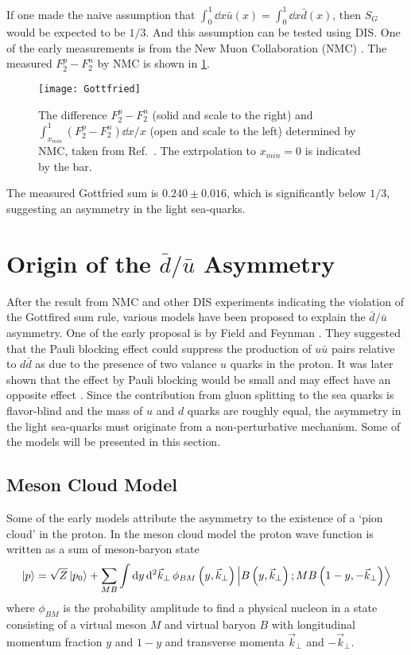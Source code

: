 \documentclass[../main.tex]{subfiles}
\begin{document}
If one made the naive assumption that $\int_0^1\dd{x} \bar{u}\left(x\right)=\int_0^1\dd{x} \bar{d}\left(x\right)$,
then $S_G$ would be expected to be $1/3$. And this assumption can be tested using DIS.
One of the early measurements is from the New Muon Collaboration (NMC) \cite{amaudruz1991}.
The measured $F_2^p-F_2^n$ by NMC is shown in \cref{fig:NMC_Gottfried}.
\begin{figure}[htbp!]
	\centering
	\texttt{[image: Gottfried]}
	\caption{The difference $F_2^p -F_2^n$ (solid and scale to the right) and
		$\int_{x_{min}}^1 (F_2^p-F_2^n)\dd{x}/x$ (open and scale to the left)
		determined by NMC, taken from Ref.~\cite{amaudruz1991}. The extrpolation
		to $x_{min}=0$ is indicated by the bar.}
	\label{fig:NMC_Gottfried}
\end{figure}
The measured Gottfried sum is $0.240 \pm 0.016$, which is significantly below
$1/3$, suggesting an asymmetry in the light sea-quarks.

\section{Origin of the \texorpdfstring{$\bar{d}/\bar{u}$}{dbar/ubar} Asymmetry }
After the result from NMC and other DIS experiments indicating the violation of the Gottfired sum rule,
various models have been proposed to explain the $\bar{d}/\bar{u}$ asymmetry. One of the early proposal
is by Field and Feynman \cite{field1977}. They suggested that the Pauli blocking effect
could suppress the production of $u\bar{u}$ pairs relative to  $d\bar{d}$ as due to the presence of two
valance $u$ quarks in the proton. It was later shown that the effect by Pauli blocking would be small and
may effect have an opposite effect \cite{steffens1997}. Since the contribution from gluon splitting to the
sea quarks is flavor-blind and the mass of $u$ and $d$ quarks are roughly equal, the asymmetry in the
light sea-quarks must originate from a non-perturbative mechanism. Some of the models will be presented in this section.

\subsection{Meson Cloud Model}
Some of the early models attribute the asymmetry to the existence of a `pion cloud' in the proton.
In the meson cloud model \cite{kumano1998} the proton wave function is written as a sum of meson-baryon state
\begin{equation}
	\ket{p} = \sqrt{Z}\ket{p_0} + \sum_{MB}\int \dd{y} \dd[2]{\vec{k}_\perp} \phi_{BM} \left(y, \vec{k}_\perp\right)\ket{B\left(y, \vec{k}_\perp\right);MB\left(1-y, -\vec{k}_\perp\right)}
\end{equation}
where $\phi_{BM}$ is the probability amplitude to find a physical nucleon in a state consisting of a virtual
meson $M$ and virtual baryon $B$ with longitudinal momentum fraction $y$ and $1-y$ and transverse momenta
$\vec{k}_\perp$ and $-\vec{k}_\perp$.
\end{document}
